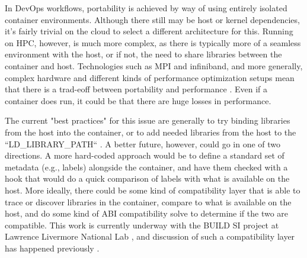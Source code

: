 In DevOps workflows, portability is achieved by way of using entirely isolated container environments. Although there still may be host or kernel dependencies, it's fairly trivial on the cloud to select a different architecture for this.
Running on HPC, however, is much more complex, as there is typically more of a seamless environment with the host, or if not, the need to share libraries between the container and host. Technologies such as MPI and infiniband, and more generally, complex hardware and different kinds of performance optimization setups mean that there is a trad-eoff between portability and performance \cite{Younge2019-uk}. Even if a container does run, it could be that there are huge losses in performance. 

The current "best practices" for this issue are generally to try binding libraries from the host into the container, or to add needed libraries from the host to the ``LD\_LIBRARY\_PATH`` \cite{Younge2019-uk}. A better future, however, could go in one of two directions. A more hard-coded approach would be to define a standard set of metadata (e.g., labels) alongside the container, and have them checked with a hook \cite{oci-hooks} that would do a quick comparison of labels with what is available on the host. More ideally, there could be some kind of compatibility layer that is able to trace or discover libraries in the container, compare to what is available on the host, and do some kind of ABI compatibility solve to determine if the two are compatible. This work is currently underway with the BUILD SI project at Lawrence Livermore National Lab \cite{buildsi}, and discussion of such a compatibility layer has happened previously \cite{Younge2019-uk}.
